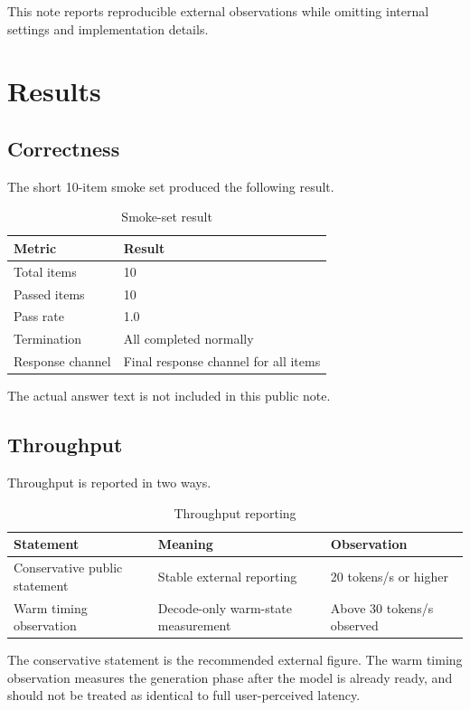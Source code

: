\documentclass[11pt]{article}
\begin{document}
This note reports reproducible external observations while omitting internal settings and implementation details.

\section{Results}

\subsection{Correctness}

The short 10-item smoke set produced the following result.

\begin{table}[h]
\centering
\begin{tabular}{ll}
\toprule
Metric & Result \\
\midrule
Total items & 10 \\
Passed items & 10 \\
Pass rate & 1.0 \\
Termination & All completed normally \\
Response channel & Final response channel for all items \\
\bottomrule
\end{tabular}
\caption{Smoke-set result}
\end{table}

The actual answer text is not included in this public note.

\subsection{Throughput}

Throughput is reported in two ways.

\begin{table}[h]
\centering
\begin{tabular}{lll}
\toprule
Statement & Meaning & Observation \\
\midrule
Conservative public statement & Stable external reporting & 20 tokens/s or higher \\
Warm timing observation & Decode-only warm-state measurement & Above 30 tokens/s observed \\
\bottomrule
\end{tabular}
\caption{Throughput reporting}
\end{table}

The conservative statement is the recommended external figure. The warm timing observation measures the generation phase after the model is already ready, and should not be treated as identical to full user-perceived latency.
\end{document}
